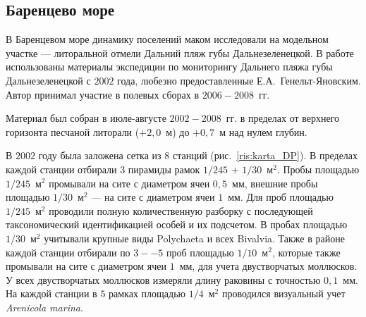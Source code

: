 

        \subsection{Баренцево море}

В Баренцевом море динамику поселений маком исследовали на модельном участке --- литоральной отмели Дальний пляж губы Дальнезеленецкой. 
В работе использованы материалы экспедиции по мониторингу Дальнего пляжа губы Дальнезеленецкой с $2002$ года, любезно предоставленные Е.\:А.~Генельт-Яновским.
Автор принимал участие в полевых сборах в $2006 - 2008$~гг.

Материал был собран в июле-августе $2002 - 2008$~гг. в пределах от верхнего горизонта песчаной литорали ($+2,0$~м) до $+0,7$~м над нулем глубин. 

 В $2002$ году была заложена сетка из $8$ станций (рис.~\ref{ris:karta_DP}). 
 В пределах каждой станции отбирали $3$ пирамиды рамок $1/245$ + $1/30$~м$^2$. 
 Пробы площадью $1/245$~м$^2$ промывали на сите с диаметром ячеи $0,5$~мм, внешние пробы площадью $1/30$~м$^2$ --- на сите с диаметром ячеи $1$~мм. 
 Для проб площадью $1/245$~м$^2$ проводили полную количественную разборку с последующей таксономический идентификацией особей и их подсчетом. 
 В пробах  площадью $1/30$~м$^2$ учитывали крупные виды Polychaeta и всех Bivalvia. 
 Также в районе каждой станции отбирали по $3--5$ проб площадью $1/10$~м$^2$, которые также промывали на сите с диаметром ячеи $1$~мм, для учета двустворчатых моллюсков.  
 У всех двустворчатых моллюсков измеряли длину раковины с точностью $0,1$~мм. 
 На каждой станции в $5$ рамках площадью $1/4$~м$^2$ проводился визуальный учет {\it Arenicola marina}.

